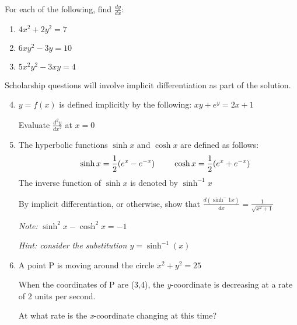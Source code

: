 \documentclass[../main.tex]{subfiles}
\begin{document}
For each of the following, find \(\frac{dy}{dx}\):
\begin{enumerate}
    \item \(4x^2 +2y^2 = 7\) 
    
    \item \(6xy^2 - 3y=10\) 
    
    \item \(5x^2y^2 -3xy=4\) 
    
\end{enumerate}
Scholarship questions will involve implicit differentiation as part of the solution.
\begin{enumerate}
    \setcounter{enumi}{3}
    \item \(y=f(x)\) is defined implicitly by the following: \(xy+e^y=2x+1\)
    
    Evaluate \( \frac{d^2y}{dx^2}\) at \(x=0\)

    \item The hyperbolic functions \(\sinh{x}\) and \(\cosh{x}\) are defined as follows:
    \begin{align*}
        &\hspace{0.5cm} \sinh{x}=\frac{1}{2}(e^x-e^{-x}) 
        &\hspace{0.5cm} \cosh{x}=\frac{1}{2}(e^x+e^{-x}) 
    \end{align*}    
    The inverse function of \(\sinh{x}\) is denoted by \(\sinh^{-1}{x}\)

    By implicit differentiation, or otherwise, show that \( \frac{d(\sinh^-1x)}{dx}=\frac{1}{\sqrt{x^2+1}}\)

    \textit{Note:} \(\sinh^2{x}-\cosh^2{x}=-1\)

    \textit{Hint: consider the substitution \(y=\sinh^{-1}(x)\)}

    \item A point P is moving around the circle \(x^2+y^2=25\)

    When the coordinates of P are (3,4), the \textit{y}-coordinate is decreasing at a rate of 2 units per second.

    At what rate is the \textit{x}-coordinate changing at this time?
\end{enumerate}

\pagebreak
\end{document}
